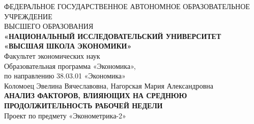 \documentclass[12pt, a4paper]{article}
\begin{document}
\begin{center}
\hfill \break
\footnotesize{ФЕДЕРАЛЬНОЕ ГОСУДАРСТВЕННОЕ АВТОНОМНОЕ ОБРАЗОВАТЕЛЬНОЕ УЧРЕЖДЕНИЕ}\\ 
\footnotesize{ВЫСШЕГО ОБРАЗОВАНИЯ}\\
\small{\textbf{«НАЦИОНАЛЬНЫЙ ИССЛЕДОВАТЕЛЬСКИЙ УНИВЕРСИТЕТ \\ «ВЫСШАЯ ШКОЛА ЭКОНОМИКИ»}}\\
\hfill \break
\normalsize{Факультет экономических наук}\\
\normalsize{Образовательная программа «Экономика»,}\\
\normalsize{по направлению 38.03.01 «Экономика»}\\
 \hfill \break
\hfill\break
\hfill\break
\hfill \break
\hfill \break
\hfill \break
 \hfill \break
 \hfill \break
 \hfill \break
 \hfill \break
\normalsize{Коломоец Эвелина Вячеславовна, Нагорская Мария Александровна}\\
\large{\textbf{АНАЛИЗ ФАКТОРОВ, ВЛИЯЮЩИХ НА СРЕДНЮЮ ПРОДОЛЖИТЕЛЬНОСТЬ РАБОЧЕЙ НЕДЕЛИ}}\\
\hfill \break
\hfill \break
\hfill \break
\normalsize{Проект по предмету «Эконометрика-2»}\\
\hfill \break
\hfill \break
\end{center}
\end{document}
